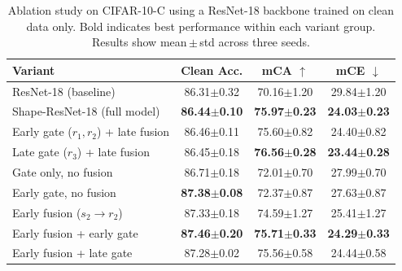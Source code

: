 \begin{table}[htbp]
\caption{Ablation study on {CIFAR}-10-{C} using a {ResNet}-18 backbone trained on clean data only. Bold indicates best performance within each variant group. Results show mean\,$\pm$\,std across three seeds.}
\begin{center}
\begin{tabular}{|l|c|c|c|}
\hline
\textbf{Variant} & \textbf{Clean Acc.} & \textbf{mCA $\uparrow$} & \textbf{mCE $\downarrow$} \\
\hline
ResNet-18 (baseline) & 86.31$\pm$0.32 & 70.16$\pm$1.20 & 29.84$\pm$1.20 \\
Shape-ResNet-18 (full model) & \textbf{86.44$\pm$0.10} & \textbf{75.97$\pm$0.23} & \textbf{24.03$\pm$0.23} \\
\hline
Early gate ($r_1, r_2$) + late fusion & 86.46$\pm$0.11 & 75.60$\pm$0.82 & 24.40$\pm$0.82 \\
Late gate ($r_3$) + late fusion & 86.45$\pm$0.18 & \textbf{76.56$\pm$0.28} & \textbf{23.44$\pm$0.28} \\
Gate only, no fusion & 86.71$\pm$0.18 & 72.01$\pm$0.70 & 27.99$\pm$0.70 \\
Early gate, no fusion & \textbf{87.38$\pm$0.08} & 72.37$\pm$0.87 & 27.63$\pm$0.87 \\
\hline
Early fusion ($s_2 \to r_2$) & 87.33$\pm$0.18 & 74.59$\pm$1.27 & 25.41$\pm$1.27 \\
Early fusion + early gate & \textbf{87.46$\pm$0.20} & \textbf{75.71$\pm$0.33} & \textbf{24.29$\pm$0.33} \\
Early fusion + late gate & 87.28$\pm$0.02 & 75.56$\pm$0.58 & 24.44$\pm$0.58 \\
\hline
\end{tabular}
\label{tab:ablation}
\end{center}
\end{table}